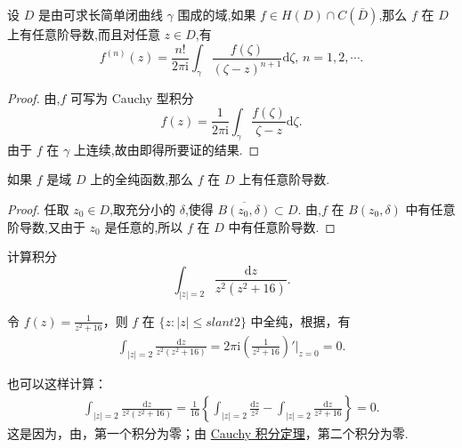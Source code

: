 \documentclass[../../main.tex]{subfiles}
\begin{document}
\begin{theorem}\label{theorem:定理3.4.3}
设 \( D \) 是由可求长简单闭曲线 \( \gamma \) 围成的域,如果 \( f \in H(D) \cap C(\overline{D}) \),那么 \( f \) 在 \( D \) 上有任意阶导数,而且对任意 \( z \in D \),有
\[
f^{(n)}(z) = \frac{n!}{2\pi \mathrm{i}} \int_{\gamma} \frac{f(\zeta)}{(\zeta - z)^{n + 1}} \mathrm{d}\zeta, \, n = 1, 2, \cdots.
\]
\end{theorem}
\begin{proof}
由,\( f \) 可写为 Cauchy 型积分
\[
f(z) = \frac{1}{2\pi \mathrm{i}} \int_{\gamma} \frac{f(\zeta)}{\zeta - z} \mathrm{d}\zeta.
\]
由于 \( f \) 在 \( \gamma \) 上连续,故由即得所要证的结果. 
\end{proof}

\begin{theorem}\label{theorem:定理3.4.4}
如果 \( f \) 是域 \( D \) 上的全纯函数,那么 \( f \) 在 \( D \) 上有任意阶导数.
\end{theorem}
\begin{proof}
任取 \( z_0 \in D \),取充分小的 \( \delta \),使得 \( \overline{B(z_0, \delta)} \subset D \). 由,\( f \) 在 \( B(z_0, \delta) \) 中有任意阶导数,又由于 \( z_0 \) 是任意的,所以 \( f \) 在 \( D \) 中有任意阶导数. 
\end{proof}

\begin{example}
计算积分
\[
\int_{|z| = 2} \frac{\mathrm{d}z}{z^2(z^2 + 16)}.
\]
\end{example}
\begin{solution}
令 \( f(z) = \frac{1}{z^2 + 16} \)，则 \( f \) 在 \( \{z: |z| \leqslant slant 2\} \) 中全纯，根据，有
\begin{align*}
\int_{|z| = 2} \frac{\mathrm{d}z}{z^2(z^2 + 16)} = 2\pi \mathrm{i} \left( \frac{1}{z^2 + 16} \right)' \bigg|_{z = 0} = 0.
\end{align*}

也可以这样计算：
\begin{align*}
\int_{|z| = 2} \frac{\mathrm{d}z}{z^2(z^2 + 16)} = \frac{1}{16} \left\{ \int_{|z| = 2} \frac{\mathrm{d}z}{z^2} - \int_{|z| = 2} \frac{\mathrm{d}z}{z^2 + 16} \right\} = 0.
\end{align*}
这是因为，由，第一个积分为零；由 \hyperref[theorem:Cauchy-Goursat定理(Cauchy积分定理)]{Cauchy 积分定理}，第二个积分为零. 
\end{solution}
\end{document}
